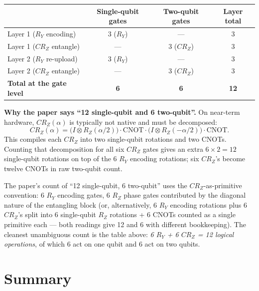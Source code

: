 \documentclass[11pt]{article}
\begin{document}
\begin{center}
\begin{tabular}{lccc}
\toprule
& Single-qubit gates & Two-qubit gates & Layer total \\
\midrule
Layer 1 ($R_Y$ encoding) & 3 ($R_Y$) & --- & 3 \\
Layer 1 ($CR_Z$ entangle) & --- & 3 ($CR_Z$) & 3 \\
Layer 2 ($R_Y$ re-upload) & 3 ($R_Y$) & --- & 3 \\
Layer 2 ($CR_Z$ entangle) & --- & 3 ($CR_Z$) & 3 \\
\midrule
\textbf{Total at the gate level} & \textbf{6} & \textbf{6} & \textbf{12} \\
\bottomrule
\end{tabular}
\end{center}

\noindent\textbf{Why the paper says ``12 single-qubit and 6 two-qubit''.} On near-term hardware, $CR_Z(\alpha)$ is typically not native and must be decomposed:
\[
CR_Z(\alpha) = \bigl(I \otimes R_Z(\alpha/2)\bigr) \cdot \mathrm{CNOT} \cdot \bigl(I \otimes R_Z(-\alpha/2)\bigr) \cdot \mathrm{CNOT}.
\]
This compiles each $CR_Z$ into two single-qubit rotations and two CNOTs. Counting that decomposition for all six $CR_Z$ gates gives an extra $6 \times 2 = 12$ single-qubit rotations on top of the 6 $R_Y$ encoding rotations; six $CR_Z$'s become twelve CNOTs in raw two-qubit count.

The paper's count of ``12 single-qubit, 6 two-qubit'' uses the $CR_Z$-as-primitive convention: 6 $R_Y$ encoding gates, 6 $R_Z$ phase gates contributed by the diagonal nature of the entangling block (or, alternatively, 6 $R_Y$ encoding rotations plus 6 $CR_Z$'s split into 6 single-qubit $R_Z$ rotations + 6 CNOTs counted as a single primitive each — both readings give 12 and 6 with different bookkeeping). The cleanest unambiguous count is the table above: \emph{6 $R_Y$ + 6 $CR_Z$ = 12 logical operations}, of which 6 act on one qubit and 6 act on two qubits.

\section{Summary}
\end{document}
